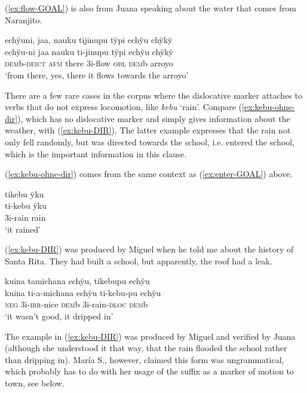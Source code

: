 (\ref{ex:flow-GOAL}) is also from Juana speaking about the water that comes from Naranjito.

\ea\label{ex:flow-GOAL}
\begingl 
\glpreamble echÿuni, jaa, nauku tijinupu tÿpi echÿu chÿkÿ\\
\gla echÿu-ni jaa nauku ti-jinupu tÿpi echÿu chÿkÿ\\ 
\glb \textsc{dem}b-\textsc{deict} \textsc{afm} there 3i-flow \textsc{obl} \textsc{dem}b arroyo\\ 
\glft ‘from there, yes, there it flows towards the arroyo’\\ 
\endgl
\trailingcitation{[jxx-p120515l-2.129-131]}
\xe
{}

There are a few rare cases in the corpus where the dislocative marker attaches to verbs that do not express locomotion, like \textit{kebu} ‘rain’. Compare  (\ref{ex:kebu-ohne-dir}), which has no dislocative marker and simply gives information about the weather, with (\ref{ex:kebu-DIR}). The latter example expresses that the rain not only fell randomly, but was directed towards the school, i.e. entered the school, which is the important information in this clause.

(\ref{ex:kebu-ohne-dir}) comes from the same context as (\ref{ex:enter-GOAL}) above.

\ea\label{ex:kebu-ohne-dir}
\begingl 
\glpreamble tikebu ÿku\\
\gla ti-kebu ÿku\\ 
\glb 3i-rain rain\\ 
\glft ‘it rained’\\ 
\endgl
\trailingcitation{[jxx-p151016l-2]}
\xe

(\ref{ex:kebu-DIR}) was produced by Miguel when he told me about the history of Santa Rita. They had built a school, but apparently, the roof had a leak. 

\ea\label{ex:kebu-DIR}
\begingl 
\glpreamble kuina tamichana echÿu, tikebupu echÿu\\
\gla kuina ti-a-michana echÿu ti-kebu-pu echÿu\\ 
\glb \textsc{neg} 3i-\textsc{irr}-nice \textsc{dem}b 3i-rain-\textsc{dloc} \textsc{dem}b\\ 
\glft ‘it wasn’t good, it dripped in’\\ 
\endgl
\trailingcitation{[mxx-p110825l.089]}
\xe

The example in (\ref{ex:kebu-DIR}) was produced by Miguel and verified by Juana (although she understood it that way, that the rain flooded the school rather than dripping in). María S., however, claimed this form was ungrammatical, which probably has to do with her usage of the suffix as a marker of motion to town, see below.

